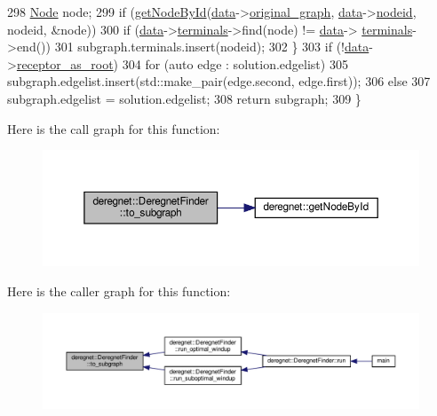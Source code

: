 \begin{DoxyCode}
298             \hyperlink{namespacederegnet_a744bad34f2de9856d36715a445f027f3}{Node} node;
299             \textcolor{keywordflow}{if} (\hyperlink{namespacederegnet_afefc9088a0ea47e8d8c1225b5de29244}{getNodeById}(\hyperlink{classderegnet_1_1DeregnetFinder_ab158f2a6bb7f39ed3d6e4a9ffe568232}{data}->\hyperlink{classderegnet_1_1DeregnetData_a3ea2abe9900785d80fa0141afdd985a9}{original\_graph}, 
      \hyperlink{classderegnet_1_1DeregnetFinder_ab158f2a6bb7f39ed3d6e4a9ffe568232}{data}->\hyperlink{classderegnet_1_1DeregnetData_a3b57d7ed19c104c7fe257e17f0d2cfb5}{nodeid}, nodeid, &node))
300                 \textcolor{keywordflow}{if} (\hyperlink{classderegnet_1_1DeregnetFinder_ab158f2a6bb7f39ed3d6e4a9ffe568232}{data}->\hyperlink{classderegnet_1_1DeregnetData_a1fe559c6056cd411647f836849e4b0da}{terminals}->find(node) != \hyperlink{classderegnet_1_1DeregnetFinder_ab158f2a6bb7f39ed3d6e4a9ffe568232}{data}->
      \hyperlink{classderegnet_1_1DeregnetData_a1fe559c6056cd411647f836849e4b0da}{terminals}->end())
301                     subgraph.terminals.insert(nodeid);
302         \}
303     \textcolor{keywordflow}{if} (!\hyperlink{classderegnet_1_1DeregnetFinder_ab158f2a6bb7f39ed3d6e4a9ffe568232}{data}->\hyperlink{classderegnet_1_1DeregnetData_ae7936fe59661a68464134b9251303727}{receptor\_as\_root})
304         \textcolor{keywordflow}{for} (\textcolor{keyword}{auto} edge : solution.edgelist)
305             subgraph.edgelist.insert(std::make\_pair(edge.second, edge.first));
306     \textcolor{keywordflow}{else}
307         subgraph.edgelist = solution.edgelist;
308     \textcolor{keywordflow}{return} subgraph;
309 \}
\end{DoxyCode}
Here is the call graph for this function\+:\nopagebreak
\begin{figure}[H]
\begin{center}
\leavevmode
\includegraphics[width=350pt]{classderegnet_1_1DeregnetFinder_a681d5e2506f9b6075ab36e742a360328_cgraph}
\end{center}
\end{figure}
Here is the caller graph for this function\+:\nopagebreak
\begin{figure}[H]
\begin{center}
\leavevmode
\includegraphics[width=350pt]{classderegnet_1_1DeregnetFinder_a681d5e2506f9b6075ab36e742a360328_icgraph}
\end{center}
\end{figure}


